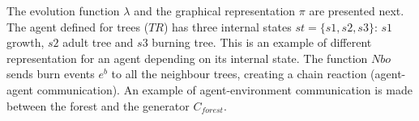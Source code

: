 \documentclass[a4paper,twoside]{article}
\begin{document}
The evolution function $\lambda$ and the graphical representation $\pi$ are presented next. The
agent defined for trees ($TR$) has three internal states $st = \{s1, s2, s3 \}$: $s1$ growth, $s2$
adult tree and $s3$ burning tree. This is an example of different representation for an agent
depending on its internal state. The function $Nbo$ sends burn events $e^b$ to all the neighbour
trees, creating a chain reaction (agent-agent communication). An example of agent-environment
communication is made between the forest and the generator $C_{forest}$.


\begin{table}[h]
\begin{center}
\end{center}
\end{table}
\end{document}

